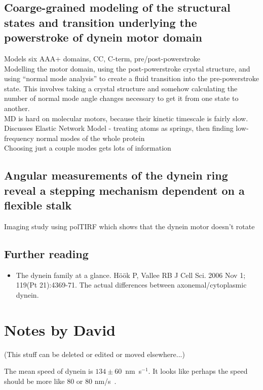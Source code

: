 \documentclass[10pt]{article} %
\begin{document}
\subsection{Coarge-grained modeling of the structural states and transition underlying the powerstroke of dynein motor domain}
Models six AAA+ domains, CC, C-term, pre/post-powerstroke\\

Modelling the motor domain, using the post-powerstroke crystal structure, and using ``normal mode analysis'' to create a fluid transition into the pre-powerstroke state. This involves taking a crystal structure and somehow calculating the number of normal mode angle changes necessary to get it from one state to another.\\

MD is hard on molecular motors, because their kinetic timescale is fairly slow.\\

Discusses Elastic Network Model - treating atoms as springs, then finding low-frequency normal modes of the whole protein\\

Choosing just a couple modes gets lots of information

\subsection{Angular measurements of the dynein ring reveal a stepping mechanism dependent on a flexible stalk}
Imaging study using polTIRF which shows that the dynein motor doesn't rotate


\subsection{Further reading}
\begin{itemize}
\item The dynein family at a glance. Höök P, Vallee RB J Cell Sci. 2006 Nov 1; 119(Pt 21):4369-71. The actual differences between axonemal/cytoplasmic dynein.
\end{itemize}

\section{Notes by David}
(This stuff can be deleted or edited or moved elsewhere...)

The mean speed of dynein is $134\pm 60$~nm~s$^{-1}$.  It looks like
perhaps the speed should be more like 80 or 80 nm/s~\cite{reck2006single}.
\end{document}
